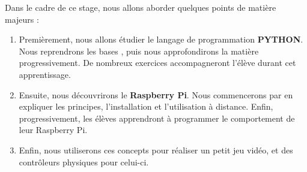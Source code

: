 
Dans le cadre de ce stage, nous allons aborder quelques points de matière majeurs :
\begin{enumerate}
 \item Premièrement, nous allons étudier le langage de programmation \textbf{PYTHON}.%
 Nous reprendrons les bases%
 , puis nous approfondirons la matière progressivement. De nombreux exercices accompagneront l'élève durant cet apprentissage.\\
 \item Ensuite, nous découvrirons le \textbf{Raspberry Pi}. Nous commencerons par en expliquer les principes, l'installation et l'utilisation à distance. Enfin, progressivement, les élèves apprendront à programmer le comportement de leur Raspberry Pi.\\
 \item Enfin, nous utiliserons ces concepts pour réaliser un petit jeu vidéo, et des contrôleurs physiques pour celui-ci.\\
\end{enumerate}




